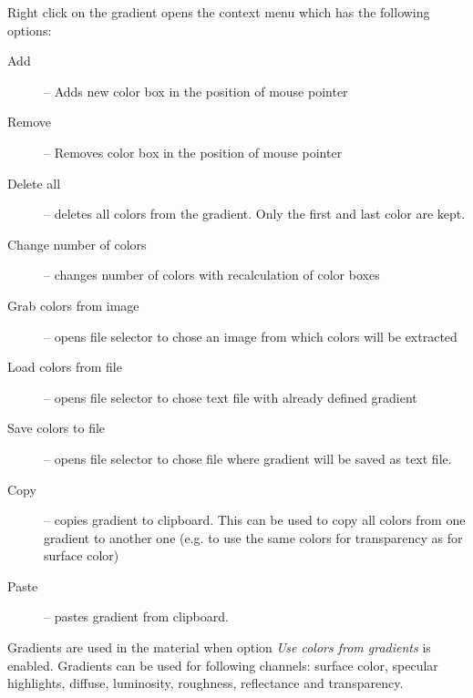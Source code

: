 Right click on the gradient opens the context menu which has the following options:
\nopagebreak
\begin{description}
	\item[Add] -- Adds new color box in the position of mouse pointer
	\item[Remove] -- Removes color box in the position of mouse pointer
	\item[Delete all] -- deletes all colors from the gradient. Only the first and last color are kept.
	\item[Change number of colors] -- changes number of colors with recalculation of color boxes
	\item[Grab colors from image] -- opens file selector to chose an image from which colors will be extracted
	\item[Load colors from file] -- opens file selector to chose text file with already defined gradient
	\item[Save colors to file] -- opens file selector to chose file where gradient will be saved as text file.
	\item[Copy] -- copies gradient to clipboard. This can be used to copy all colors from one gradient to another one (e.g. to use the same colors for transparency as for surface color)
	\item[Paste] -- pastes gradient from clipboard. 
\end{description}

Gradients are used in the material when option \emph{Use colors from gradients} is enabled. Gradients can be used for following channels: surface color, specular highlights, diffuse, luminosity, roughness, reflectance and transparency.

